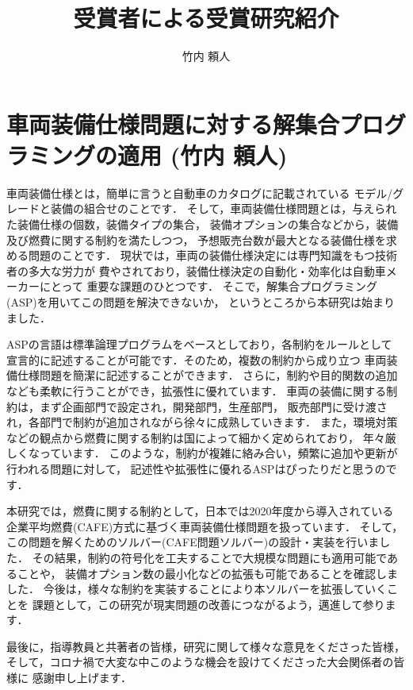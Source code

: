 \documentclass[T]{compsoft}
\begin{document}
\title{受賞者による受賞研究紹介}

%
\author{竹内 頼人}
\maketitle 
\section{車両装備仕様問題に対する解集合プログラミングの適用 (竹内 頼人)}
車両装備仕様とは，簡単に言うと自動車のカタログに記載されている
モデル/グレードと装備の組合せのことです．
そして，車両装備仕様問題とは，与えられた装備仕様の個数，装備タイプの集合，
装備オプションの集合などから，装備及び燃費に関する制約を満たしつつ，
予想販売台数が最大となる装備仕様を求める問題のことです．
現状では，車両の装備仕様決定には専門知識をもつ技術者の多大な労力が
費やされており，装備仕様決定の自動化・効率化は自動車メーカーにとって
重要な課題のひとつです．
そこで，解集合プログラミング(ASP)を用いてこの問題を解決できないか，
というところから本研究は始まりました．

ASPの言語は標準論理プログラムをベースとしており，各制約をルールとして
宣言的に記述することが可能です．そのため，複数の制約から成り立つ
車両装備仕様問題を簡潔に記述することができます．
さらに，制約や目的関数の追加なども柔軟に行うことができ，拡張性に優れています．
車両の装備に関する制約は，まず企画部門で設定され，開発部門，生産部門，
販売部門に受け渡され，各部門で制約が追加されながら徐々に成熟していきます．
また，環境対策などの観点から燃費に関する制約は国によって細かく定められており，
年々厳しくなっています．
このような，制約が複雑に絡み合い，頻繁に追加や更新が行われる問題に対して，
記述性や拡張性に優れるASPはぴったりだと思うのです．

本研究では，燃費に関する制約として，日本では2020年度から導入されている
企業平均燃費(CAFE)方式に基づく車両装備仕様問題を扱っています．
そして，この問題を解くためのソルバー(CAFE問題ソルバー)の設計・実装を行いました．
その結果，制約の符号化を工夫することで大規模な問題にも適用可能であることや，
装備オプション数の最小化などの拡張も可能であることを確認しました．
今後は，様々な制約を実装することにより本ソルバーを拡張していくことを
課題として，この研究が現実問題の改善につながるよう，邁進して参ります．


最後に，指導教員と共著者の皆様，研究に関して様々な意見をくださった皆様，
そして，コロナ禍で大変な中このような機会を設けてくださった大会関係者の皆様に
感謝申し上げます．
\end{document}
